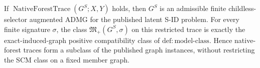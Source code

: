 If \(\operatorname{NativeForestTrace}(G^S;X,Y)\) holds, then \(G^S\) is an admissible finite childless-selector augmented ADMG for the published latent S-ID problem. For every finite signature \(\sigma\), the class \(\mathfrak M_+(G^S,\sigma)\) on this restricted trace is exactly the exact-induced-graph positive compatibility class of \(\mathrm{def:model\text{-}class}\). Hence native-forest traces form a subclass of the published graph instances, without restricting the SCM class on a fixed member graph.